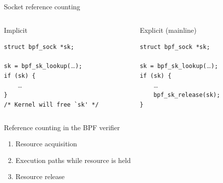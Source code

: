 \documentclass[black,white]{beamer}
\begin{document}
    \begin{frame}[fragile]{Socket reference counting}
        \begin{columns}[c]
            \hspace{0.02\textwidth}
            \begin{column}{0.46\textwidth}
            \begin{center}
            Implicit \bigskip
            \end{center}
            \verb+struct bpf_sock *sk;+\\
            ~\\
            \verb+sk = bpf_sk_lookup(+\ldots\verb+);+\\
            \verb+if (sk) {+\\
            ~~~~\ldots\\
            \verb+}+\\
            \verb+/* Kernel will free `sk' */+\\
            \end{column}
            \hspace{0.02\textwidth}
            \vrule{}
            \hspace{0.02\textwidth}
            \begin{column}{0.46\textwidth}
            \begin{center}
            Explicit (mainline) \bigskip
            \end{center}
            \verb+struct bpf_sock *sk;+\\
            ~\\
            \verb+sk = bpf_sk_lookup(+\ldots\verb+);+\\
            \verb+if (sk) {+\\
            ~~~~\ldots\\
            ~~~~\verb+bpf_sk_release(sk);+\\
            \verb+}+\\
            \end{column}
            \hspace{0.02\textwidth}
        \end{columns}
    \end{frame}

    \begin{frame}{Reference counting in the BPF verifier}
        \begin{enumerate}
            \item Resource acquisition \bigskip
            \item Execution paths while resource is held \bigskip
            \item Resource release \bigskip
        \end{enumerate}
    \end{frame}
\end{document}
